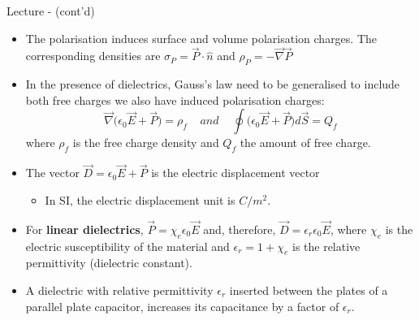 %
%
%

\begin{frame}{Lecture \summarizedlecture - \lecturesummarytitle (cont'd)}

\begin{itemize}

   \item  The polarisation induces surface and volume polarisation charges.
          The corresponding densities are
          $\sigma_P = \vec{P} \cdot \hat{n}$ and $\rho_P = - \vec{\nabla} \vec{P}$

          \vspace{0.1cm}

    \item In the presence of dielectrics,  Gauss's law need to be generalised
          to include both free charges we also have induced polarisation charges:
          \begin{equation*}
             \vec{\nabla} \Big( \epsilon_0 \vec{E} + \vec{P} \Big) = \rho_f
              \;\;\;\; and \;\;\;\;
              \oint  \Big( \epsilon_0 \vec{E} + \vec{P} \Big) d\vec{S} = Q_f
          \end{equation*}
          where $\rho_f$ is the free charge density and $Q_f$ the amount of free charge.

          \vspace{0.1cm}

    \item The vector
           $\vec{D} = \epsilon_0 \vec{E} + \vec{P}$ is the electric displacement vector
          \begin{itemize}
             \item In SI, the electric displacement unit is $C/m^2$.
          \end{itemize}

          \vspace{0.1cm}

    \item For {\bf linear dielectrics},
              $\vec{P} = \chi_{e} \epsilon_0 \vec{E}$ and, therefore,
              $\vec{D} = \epsilon_r \epsilon_0 \vec{E}$,
              where
              $\chi_{e}$ is the electric susceptibility of the material and
              $\epsilon_r = 1 + \chi_e$ is the relative permittivity (dielectric constant).

 \item A dielectric with relative permittivity $\epsilon_r$ inserted
         between the plates of a parallel plate capacitor, increases
         its capacitance by a factor of $\epsilon_r$.

\end{itemize}

\end{frame}

